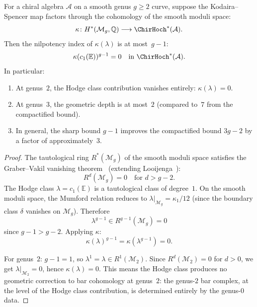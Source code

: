 \begin{theorem}
\label{thm:geometric-depth-smooth}
For a chiral algebra $\mathcal{A}$ on a smooth genus $g \geq 2$
curve, suppose the Kodaira--Spencer map factors through the
cohomology of the smooth moduli space:
\[
\kappa \colon H^*(\mathcal{M}_g, \mathbb{Q}) \longrightarrow
\ChirHoch^*(\mathcal{A}).
\]
Then the nilpotency index of $\kappa(\lambda)$ is at most~$g - 1$:
\begin{equation}\label{eq:sharp-geometric-depth}
\kappa(c_1(\mathbb{E}))^{g-1} = 0
\quad \text{in } \ChirHoch^*(\mathcal{A}).
\end{equation}
In particular:
\begin{enumerate}[label=\textup{(\alph*)}]
\item At genus~$2$, the Hodge class contribution vanishes entirely:
 $\kappa(\lambda) = 0$.
\item At genus~$3$, the geometric depth is at most~$2$
 (compared to~$7$ from the compactified bound).
\item In general, the sharp bound $g - 1$ improves the
 compactified bound $3g - 2$ by a factor of approximately~$3$.
\end{enumerate}
\end{theorem}

\begin{proof}
The tautological ring $R^*(\mathcal{M}_g)$ of the smooth
moduli space satisfies the Graber--Vakil vanishing
theorem~\cite{GraVak05} (extending Looijenga~\cite{Looij95}):
\begin{equation}\label{eq:graber-vakil-vanishing}
R^d(\mathcal{M}_g) = 0 \quad \text{for } d > g - 2.
\end{equation}
The Hodge class $\lambda = c_1(\mathbb{E})$ is a
tautological class of degree~$1$.
On the smooth moduli space, the Mumford relation reduces to
$\lambda|_{\mathcal{M}_g} = \kappa_1/12$
(since the boundary class $\delta$ vanishes on
$\mathcal{M}_g$). Therefore
\[
\lambda^{g-1} \in R^{g-1}(\mathcal{M}_g) = 0
\]
since $g - 1 > g - 2$. Applying $\kappa$:
\[
\kappa(\lambda)^{g-1} = \kappa(\lambda^{g-1}) = 0.
\]

For genus~$2$: $g - 1 = 1$, so $\lambda^1 = \lambda \in
R^1(\mathcal{M}_2)$. Since $R^d(\mathcal{M}_2) = 0$ for
$d > 0$, we get $\lambda|_{\mathcal{M}_2} = 0$, hence
$\kappa(\lambda) = 0$.
This means the Hodge class produces no geometric correction
to bar cohomology at genus~$2$: the genus-$2$ bar complex, at
the level of the Hodge class contribution, is determined
entirely by the genus-$0$ data.
\end{proof}

